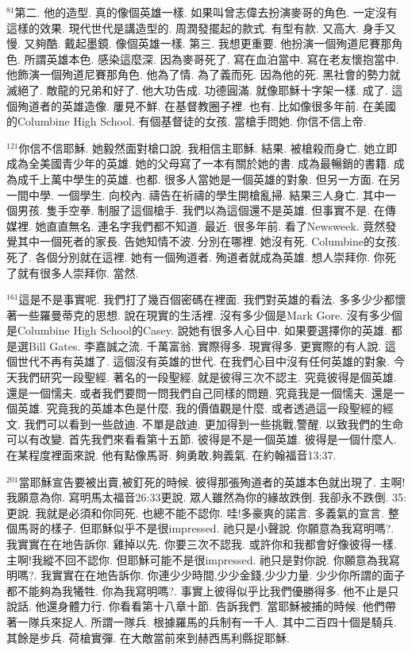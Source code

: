 \documentclass{book}
\begin{document}
$^{81}$第二.
他的造型.
真的像個英雄一樣.
如果叫曾志偉去扮演麥哥的角色.
一定沒有這樣的效果.
現代世代是講造型的.
周潤發擺起的款式.
有型有款.
又高大.
身手又慢.
又夠酷.
戴起墨鏡.
像個英雄一樣.
第三.
我想更重要.
他扮演一個殉道尼賽那角色.
所謂英雄本色.
感染這麼深.
因為麥哥死了.
寫在血泊當中.
寫在老友懷抱當中.
他飾演一個殉道尼賽那角色.
他為了情.
為了義而死.
因為他的死.
黑社會的勢力就滅絕了.
敵龍的兄弟和好了.
他大功告成.
功德圓滿.
就像耶穌十字架一樣.
成了.
這個殉道者的英雄造像.
屢見不鮮.
在基督教圈子裡.
也有.
比如像很多年前.
在美國的Columbine High School.
有個基督徒的女孩.
當槍手問她.
你信不信上帝.

$^{121}$你信不信耶穌.
她毅然面對槍口說.
我相信主耶穌.
結果.
被槍殺而身亡.
她立即成為全美國青少年的英雄.
她的父母寫了一本有關於她的書.
成為最暢銷的書籍.
成為成千上萬中學生的英雄.
也都.
很多人當她是一個英雄的對象.
但另一方面.
在另一間中學.
一個學生.
向校內.
禱告在祈禱的學生開槍亂掃.
結果三人身亡.
其中一個男孩.
隻手空拳.
制服了這個槍手.
我們以為這個還不是英雄.
但事實不是.
在傳媒裡.
她直直無名.
連名字我們都不知道.
最近.
很多年前.
看了Newsweek.
竟然發覺其中一個死者的家長.
告她知情不波.
分別在哪裡.
她沒有死.
Columbine的女孩.
死了.
各個分別就在這裡.
她有一個殉道者.
殉道者就成為英雄.
想人崇拜你.
你死了就有很多人崇拜你.
當然.

$^{161}$這是不是事實呢.
我們打了幾百個密碼在裡面.
我們對英雄的看法.
多多少少都懷著一些羅曼蒂克的思想.
說在現實的生活裡.
沒有多少個是Mark Gore.
沒有多少個是Columbine High School的Casey.
說她有很多人心目中.
如果要選擇你的英雄.
都是選Bill Gates.
李嘉誠之流.
千萬富翁.
實際得多.
現實得多.
更實際的有人說.
這個世代不再有英雄了.
這個沒有英雄的世代.
在我們心目中沒有任何英雄的對象.
今天我們研究一段聖經.
著名的一段聖經.
就是彼得三次不認主.
究竟彼得是個英雄.
還是一個懦夫.
或者我們要問一問我們自己同樣的問題.
究竟我是一個懦夫.
還是一個英雄.
究竟我的英雄本色是什麼.
我的價值觀是什麼.
或者透過這一段聖經的經文.
我們可以看到一些啟迪.
不單是啟迪.
更加得到一些挑戰,警醒.
以致我們的生命可以有改變.
首先我們來看看第十五節.
彼得是不是一個英雄.
彼得是一個什麼人.
在某程度裡面來說.
他有點像馬哥.
夠勇敢,夠義氣.
在約翰福音13:37.

$^{201}$當耶穌宣告要被出賣,被釘死的時候.
彼得那張殉道者的英雄本色就出現了.
主啊!我願意為你.
寫明馬太福音26:33更說.
眾人雖然為你的緣故跌倒.
我卻永不跌倒.
35:更說.
我就是必須和你同死.
也總不能不認你.
哇!多豪爽的諾言.
多義氣的宣言.
整個馬哥的樣子.
但耶穌似乎不是很impressed.
祂只是小聲說.
你願意為我寫明嗎?.
我實實在在地告訴你.
雞掉以先.
你要三次不認我.
或許你和我都會好像彼得一樣.
主啊!我縱不回不認你.
但耶穌可能不是很impressed.
祂只是對你說.
你願意為我寫明嗎?.
我實實在在地告訴你.
你連少少時間,少少金錢,少少力量.
少少你所謂的面子都不能夠為我犧牲.
你為我寫明嗎?.
事實上彼得似乎比我們優勝得多.
他不止是只說話.
他還身體力行.
你看看第十八章十節.
告訴我們.
當耶穌被捕的時候.
他們帶著一隊兵來捉人.
所謂一隊兵.
根據羅馬的兵制有一千人.
其中二百四十個是騎兵.
其餘是步兵.
荷槍實彈.
在大敵當前來到赫西馬利縣捉耶穌.
\end{document}
